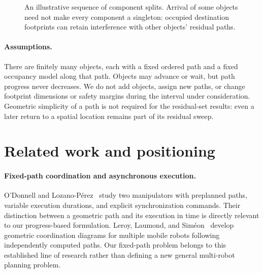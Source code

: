 \documentclass[11pt,a4paper]{article}
\theoremstyle{remark}
\begin{document}
\begin{figure}[htbp]
\centering
{}
\caption{An illustrative sequence of component splits. Arrival of some objects
need not make every component a singleton: occupied destination footprints
can retain interference with other objects' residual paths.}
\label{fig:components}
\end{figure}

\paragraph{Assumptions.}
There are finitely many objects, each with a fixed ordered path and a fixed
occupancy model along that path. Objects may advance or wait, but path progress
never decreases. We do not add objects, assign new paths, or change footprint
dimensions or safety margins during the interval under consideration.
Geometric simplicity of a path is not required for the residual-set results:
even a later return to a spatial location remains part of its residual sweep.

\section{Related work and positioning}

\paragraph{Fixed-path coordination and asynchronous execution.}
O'Donnell and Lozano-P\'erez~\cite{odonnell1989} study two manipulators with
preplanned paths, variable execution durations, and explicit synchronization
commands. Their distinction between a geometric path and its execution in
time is directly relevant to our progress-based formulation. Leroy, Laumond,
and Sim\'eon~\cite{leroy1999} develop geometric coordination diagrams for
multiple mobile robots following independently computed paths. Our fixed-path
problem belongs to this established line of research rather than defining a
new general multi-robot planning problem.
\end{document}
